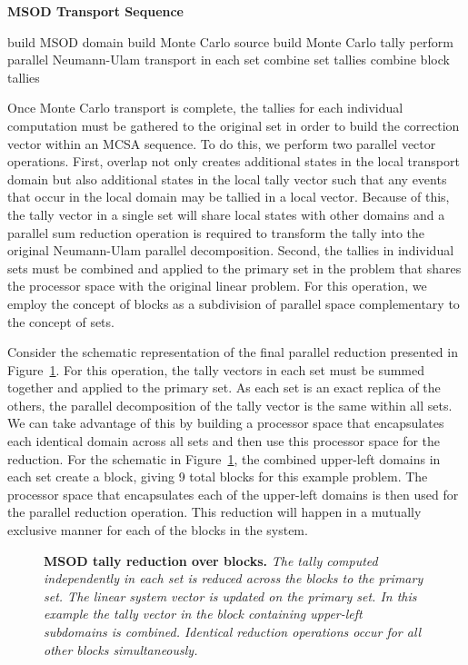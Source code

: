 \documentclass[letterpaper,11pt]{article}
\begin{document}
\begin{algorithm}[h!]
  \caption{\textbf{MSOD Transport Sequence}}
  \label{alg:msod_transport}
  \begin{algorithmic}[1]
    \State build MSOD domain
    \State build Monte Carlo source
    \State build Monte Carlo tally
    \State perform parallel Neumann-Ulam transport in each set
    \State combine set tallies
    \State combine block tallies
  \end{algorithmic}
\end{algorithm}

Once Monte Carlo transport is complete, the tallies for each
individual computation must be gathered to the original set in order
to build the correction vector within an MCSA sequence. To do this, we
perform two parallel vector operations. First, overlap not only
creates additional states in the local transport domain but also
additional states in the local tally vector such that any events that
occur in the local domain may be tallied in a local vector. Because of
this, the tally vector in a single set will share local states with
other domains and a parallel sum reduction operation is required to
transform the tally into the original Neumann-Ulam parallel
decomposition. Second, the tallies in individual sets must be combined
and applied to the primary set in the problem that shares the
processor space with the original linear problem. For this operation,
we employ the concept of blocks as a subdivision of parallel space
complementary to the concept of sets.

Consider the schematic representation of the final parallel reduction
presented in Figure~\ref{fig:msod_tally_reduction}. For this
operation, the tally vectors in each set must be summed together and
applied to the primary set. As each set is an exact replica of the
others, the parallel decomposition of the tally vector is the same
within all sets. We can take advantage of this by building a processor
space that encapsulates each identical domain across all sets and then
use this processor space for the reduction. For the schematic in
Figure~\ref{fig:msod_tally_reduction}, the combined upper-left domains
in each set create a block, giving 9 total blocks for this example
problem. The processor space that encapsulates each of the upper-left
domains is then used for the parallel reduction operation. This
reduction will happen in a mutually exclusive manner for each of the
blocks in the system.

\begin{figure}[t!]
  \begin{center}
    \scalebox{0.55}{  }
  \end{center}
  \caption{\textbf{MSOD tally reduction over blocks.} \textit{The
      tally computed independently in each set is reduced across the
      blocks to the primary set. The linear system vector is updated
      on the primary set. In this example the tally vector in the
      block containing upper-left subdomains is combined. Identical
      reduction operations occur for all other blocks
      simultaneously.}}
  \label{fig:msod_tally_reduction}
\end{figure}
\end{document}
